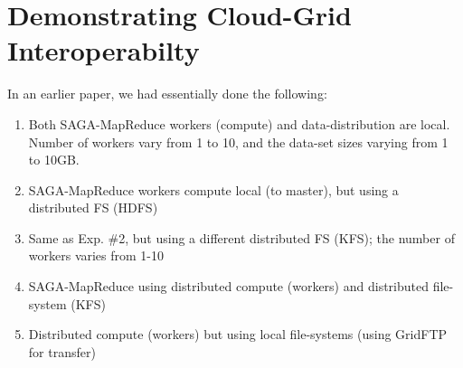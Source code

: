 \documentclass[conference,final]{IEEEtran}
\newcommand{\sagamapreduce }{SAGA-MapReduce }
\begin{document}


\section{Demonstrating Cloud-Grid Interoperabilty}

In an earlier paper, we had essentially done the following:
\begin{enumerate}
\item Both \sagamapreduce workers
  (compute) and data-distribution are local. Number of workers vary
  from 1 to 10, and the data-set sizes varying from 1 to 10GB. %
\item \sagamapreduce workers compute local (to master), but using a
  distributed FS (HDFS)
\item Same as Exp. \#2, but using a different distributed FS
  (KFS); the number of workers varies from 1-10
\item \sagamapreduce using distributed compute (workers) and distributed file-system (KFS)
\item Distributed compute (workers) but using local file-systems (using GridFTP for transfer)
\end{enumerate}
\end{document}
